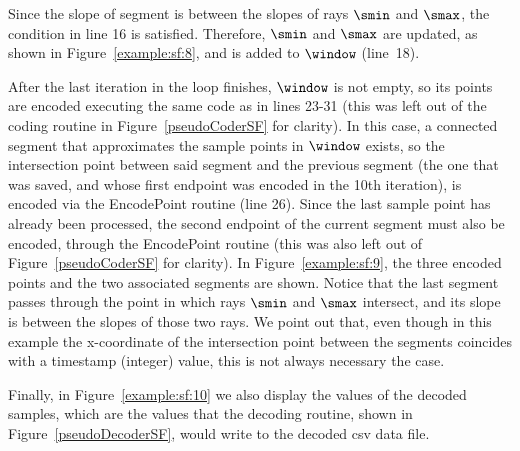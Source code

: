 \clearpage


Since the slope of segment  is between the slopes of rays $\smin$ and $\smax$, the condition in line 16 is satisfied. Therefore, $\smin$ and $\smax$ are updated, as shown in Figure~\ref{example:sf:8}, and  is added to $\window$ (line~18).


\vspace{-5pt}


\vspace{-10pt}
After the last iteration in the loop finishes, $\window$ is not empty, so its points are encoded executing the same code as in lines 23-31 (this was left out of the coding routine in Figure~\ref{pseudoCoderSF} for clarity). In this case, a connected segment that approximates the sample points in $\window$ exists, so the intersection point between said segment and the previous segment (the one that was saved, and whose first endpoint was encoded in the 10th iteration), is encoded via the EncodePoint routine (line 26). Since the last sample point has already been processed, the second endpoint of the current segment must also be encoded, through the EncodePoint routine (this was also left out of Figure~\ref{pseudoCoderSF} for clarity). In Figure~\ref{example:sf:9}, the three encoded points and the two associated segments are shown. Notice that the last segment passes through the point in which rays $\smin$ and $\smax$ intersect, and its slope is between the slopes of those two rays. We point out that, even though in this example the x-coordinate of the intersection point between the segments coincides with a timestamp (integer) value, this is not always necessary the case.




\clearpage


Finally, in Figure~\ref{example:sf:10} we also display the values of the decoded samples, which are the values that the decoding routine, shown in Figure~\ref{pseudoDecoderSF}, would write to the decoded csv data file.


